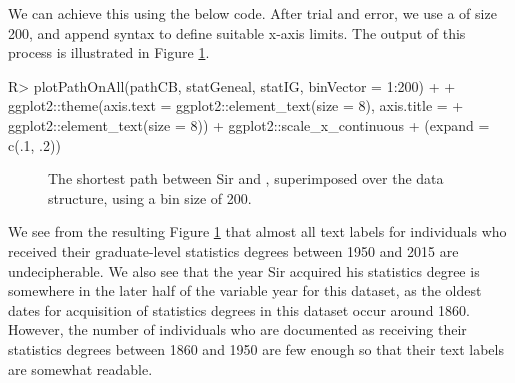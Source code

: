 \documentclass[article,shortnames]{jss}
\begin{document}
We can achieve this using the below code. After trial and error, we use a  of size 200, and append  syntax to define suitable x-axis limits. The output of this process is illustrated in Figure \ref{fig:plotCBText}.

\begin{CodeChunk}
\begin{CodeInput}
R> plotPathOnAll(pathCB, statGeneal, statIG, binVector = 1:200) +
+    ggplot2::theme(axis.text = ggplot2::element_text(size = 8), axis.title =
+    ggplot2::element_text(size = 8)) + ggplot2::scale_x_continuous
+    (expand = c(.1, .2))
\end{CodeInput}
\end{CodeChunk}

\begin{figure}[H]
    \centering
    \caption{The shortest path between Sir  and , superimposed over the data structure, using a bin size of 200.}
    \label{fig:plotCBText}
\end{figure}

We see from the resulting Figure \ref{fig:plotCBText} that almost all text labels for individuals who received their graduate-level statistics degrees between 1950 and 2015 are undecipherable. We also see that the year Sir  acquired his statistics degree is somewhere in the later half of the variable year for this dataset, as the oldest dates for acquisition of statistics degrees in this dataset occur around 1860. However, the number of individuals who are documented as receiving their statistics degrees between 1860 and 1950 are few enough so that their text labels are somewhat readable.
\end{document}
